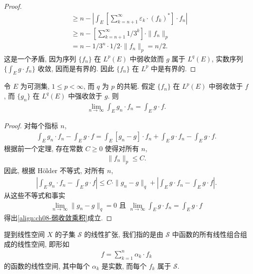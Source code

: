 \documentclass[../../main.tex]{subfiles}
\begin{document}
\begin{proof}
\begin{align*}
&\geqslant n-\left|\int_{E}\left[\sum_{k=n+1}^{\infty}\varepsilon_{k}\cdot(f_{k})^{*}\right]\cdot f_{n}\right|\\
&\geqslant n-\left[\sum_{k=n+1}^{\infty}1/3^{k}\right]\cdot\|f_{n}\|_{p}\\
&=n-1/3^{n}\cdot 1/2\cdot\|f_{n}\|_{p}=n/2.
\end{align*}
这是一个矛盾, 因为序列 $\{f_{n}\}$ 在 $L^{p}(E)$ 中弱收敛而 $g$ 属于 $L^{q}(E)$, 实数序列 $\{\int_{E}g\cdot f_{n}\}$ 收敛, 因而是有界的. 因此 $\{f_{n}\}$ 在 $L^{p}$ 中是有界的.
\end{proof}

\begin{corollary}\label{corollary:ch08-弱收敛乘积}
令 $E$ 为可测集, $1\leqslant p<\infty$, 而 $q$ 为 $p$ 的共轭. 假定 $\{f_{n}\}$ 在 $L^{p}(E)$ 中弱收敛于 $f$, 而 $\{g_{n}\}$ 在 $L^{q}(E)$ 中强收敛于 $g$. 则
\begin{align}
\lim_{n\to\infty}\int_{E}g_{n}\cdot f_{n}=\int_{E}g\cdot f.\label{align:ch08-弱收敛乘积}
\end{align}
\end{corollary}

\begin{proof}
对每个指标 $n$,
\begin{align*}
\int_{E}g_{n}\cdot f_{n}-\int_{E}g\cdot f=\int_{E}[g_{n}-g]\cdot f_{n}+\int_{E}g\cdot f_{n}-\int_{E}g\cdot f.
\end{align*}
根据前一个定理, 存在常数 $C\geqslant 0$ 使得对所有 $n$,
\begin{align*}
\|f_{n}\|_{p}\leqslant C.
\end{align*}
因此, 根据 H\"older 不等式, 对所有 $n$,
\begin{align*}
\left|\int_{E}g_{n}\cdot f_{n}-\int_{E}g\cdot f\right|\leqslant C\cdot\|g_{n}-g\|_{q}+\left|\int_{E}g\cdot f_{n}-\int_{E}g\cdot f\right|.
\end{align*}
从这些不等式和事实
\begin{align*}
\lim_{n\to\infty}\|g_{n}-g\|_{q}=0\text{ 且 }\lim_{n\to\infty}\int_{E}g\cdot f_{n}=\int_{E}g\cdot f
\end{align*}
得出\eqref{align:ch08-弱收敛乘积}成立.
\end{proof}

提到线性空间 $X$ 的子集 $\mathcal{S}$ 的线性扩张, 我们指的是由 $\mathcal{S}$ 中函数的所有线性组合组成的线性空间, 即形如
\begin{align*}
f=\sum_{k=1}^{n}\alpha_{k}\cdot f_{k}
\end{align*}
的函数的线性空间, 其中每个 $\alpha_{k}$ 是实数, 而每个 $f_{k}$ 属于 $\mathcal{S}$.
\end{document}
